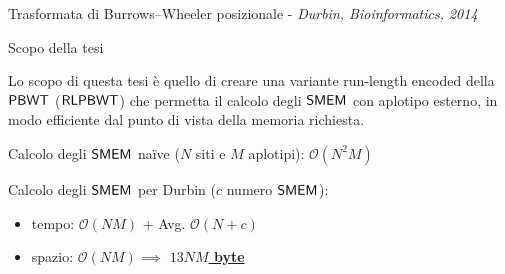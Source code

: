 \documentclass[]{beamer}
\def\PBWT{\mbox{\rm {\sf PBWT}}}
\def\RLPBWT{\mbox{\rm {\sf RLPBWT}}}
\def\SMEM{\mbox{\rm {\sf SMEM}}}
\begin{document}
\begin{frame}{{\small{Trasformata di Burrows--Wheeler posizionale -}} {\scriptsize{\textit{Durbin, Bioinformatics,
               2014}}}}
{\begin{figure}[H]
    \end{figure}
  }
\end{frame}
\begin{frame}{Scopo della tesi}
   \begin{alertblock}{}
    Lo scopo di questa tesi è quello di creare
    una variante run-length encoded della $\PBWT$ ($\RLPBWT$) che permetta
    il calcolo degli $\SMEM$ con
    aplotipo esterno, in modo efficiente dal 
    punto di vista della memoria richiesta. 
  \end{alertblock}
  \begin{block}{}
    Calcolo degli $\SMEM$ na\"{i}ve ($N$ siti e $M$
    aplotipi):
    $\mathcal{O}(N^2M)$
  \end{block}
  \begin{block}{}
    Calcolo degli $\SMEM$ per Durbin ($c$ numero $\SMEM$):
    \begin{itemize}
      \item tempo: $\mathcal{O}(\mathit{NM})$ + Avg. $\mathcal{O}(N+c)$
      \item spazio: $\mathcal{O}(\mathit{NM})\implies$
      \underline{\textbf{$13\mathit{NM}$ byte}}
    \end{itemize}
  \end{block}
 
\end{frame}
\end{document}
